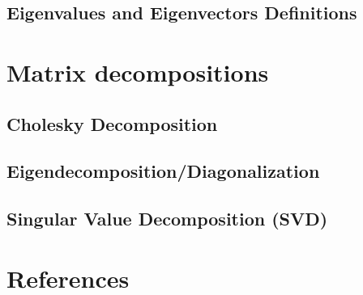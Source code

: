 \documentclass[11pt]{beamer}
\begin{document}
\subsection{Eigenvalues and Eigenvectors Definitions}


\section{Matrix decompositions}
\subsection{Cholesky Decomposition}


\subsection{Eigendecomposition/Diagonalization}

\subsection{Singular Value Decomposition (SVD)}



\section{References}

\end{document}
